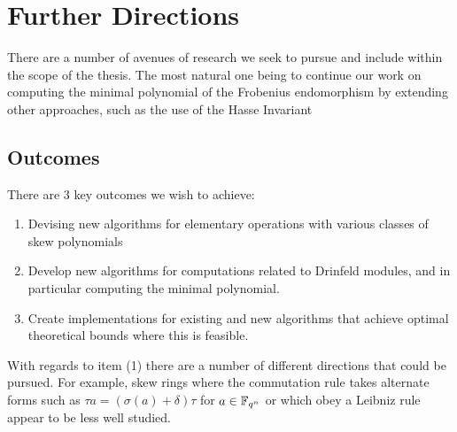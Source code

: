 
\chapter{Further Directions} \label{ch-1}

There are a number of avenues of research we seek to pursue and include within the scope of the thesis. The most natural one being to continue our work on computing the minimal polynomial of the Frobenius endomorphism by extending other approaches, such as the use of the Hasse Invariant 


\section{Outcomes}

There are 3 key outcomes we wish to achieve:

\begin{enumerate}
    \item Devising new algorithms for elementary operations with various classes of skew polynomials
    \item Develop new algorithms for computations related to Drinfeld modules, and in particular computing the minimal polynomial.
    \item Create implementations for existing and new algorithms that achieve optimal theoretical bounds where this is feasible.
\end{enumerate}

With regards to item (1) there are a number of different directions that could be pursued. For example, skew rings where the commutation rule takes alternate forms such as $\tau a = (\sigma(a) + \delta)\tau$ for $a \in \mathbb{F}_{q^n}$ or which obey a Leibniz rule appear to be less well studied. 

